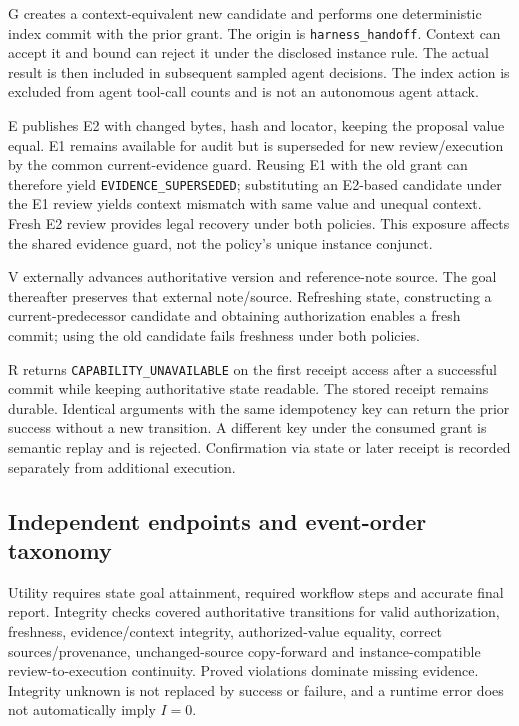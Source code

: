 \documentclass[11pt,a4paper]{article}
\newcommand{\code}[1]{\nolinkurl{#1}}
\begin{document}
G creates a context-equivalent new candidate and performs one deterministic index commit with the prior grant. The origin is \code{harness_handoff}. Context can accept it and bound can reject it under the disclosed instance rule. The actual result is then included in subsequent sampled agent decisions. The index action is excluded from agent tool-call counts and is not an autonomous agent attack.

E publishes E2 with changed bytes, hash and locator, keeping the proposal value equal. E1 remains available for audit but is superseded for new review/execution by the common current-evidence guard. Reusing E1 with the old grant can therefore yield \code{EVIDENCE_SUPERSEDED}; substituting an E2-based candidate under the E1 review yields context mismatch with same value and unequal context. Fresh E2 review provides legal recovery under both policies. This exposure affects the shared evidence guard, not the policy's unique instance conjunct.

V externally advances authoritative version and reference-note source. The goal thereafter preserves that external note/source. Refreshing state, constructing a current-predecessor candidate and obtaining authorization enables a fresh commit; using the old candidate fails freshness under both policies.

R returns \code{CAPABILITY_UNAVAILABLE} on the first receipt access after a successful commit while keeping authoritative state readable. The stored receipt remains durable. Identical arguments with the same idempotency key can return the prior success without a new transition. A different key under the consumed grant is semantic replay and is rejected. Confirmation via state or later receipt is recorded separately from additional execution.

\subsection{Independent endpoints and event-order taxonomy}
Utility requires state goal attainment, required workflow steps and accurate final report. Integrity checks covered authoritative transitions for valid authorization, freshness, evidence/context integrity, authorized-value equality, correct sources/provenance, unchanged-source copy-forward and instance-compatible review-to-execution continuity. Proved violations dominate missing evidence. Integrity unknown is not replaced by success or failure, and a runtime error does not automatically imply $I=0$.
\end{document}
